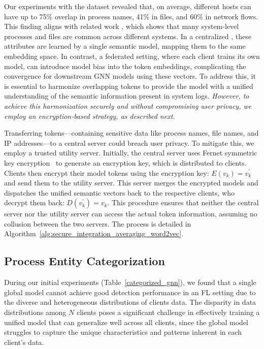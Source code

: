 Our experiments with the \optc dataset revealed that, on average, different hosts can have up to 75\% overlap in process names, 41\% in files, and 60\% in network flows. This finding aligns with related work \cite{flash2024}, which shows that many system-level processes and files are common across different systems. In a centralized \pids, these attributes are learned by a single semantic model, mapping them to the same embedding space. In contrast, a federated setting, where each client trains its own model, can introduce model bias into the token embeddings, complicating the convergence for downstream GNN models using these vectors. To address this, it is essential to harmonize overlapping tokens to provide the model with a unified understanding of the semantic information present in system logs.
\emph{However, to achieve this harmonization securely and without compromising user privacy, we employ an encryption-based strategy, as described next.}

Transferring tokens---containing sensitive data like process names, file names, and IP addresses---to a central server could breach user privacy. To mitigate this, we employ a trusted utility server. Initially, the central server uses Fernet symmetric key encryption~\cite{ismail2020fernet,bokhari2016review} to generate an encryption key, which is distributed to clients. Clients then encrypt their \wordvec model tokens using the encryption key: \(E(v_{k}) = v_{k}^{'}\) and send them to the utility server. This server merges the encrypted models and dispatches the unified semantic vectors back to the respective clients, who decrypt them back: \(D(v_{k}^{'}) = v_{k}.\) This procedure ensures that neither the central server nor the utility server can access the actual token information, assuming no collusion between the two servers. The process is detailed in Algorithm~\ref{alg:secure_integration_averaging_word2vec}.



\subsection{Process Entity Categorization}
\label{sys:catg}

During our initial experiments (Table~\ref{categorized_gnn}), we found that a single \gnnshort global model cannot achieve good detection performance in an FL setting due to the diverse and heterogeneous distributions of clients data. The disparity in data distributions among \( N \) clients poses a significant challenge in effectively training a unified model that can generalize well across all clients, since the global model struggles to capture the unique characteristics and patterns inherent in each client's data.

